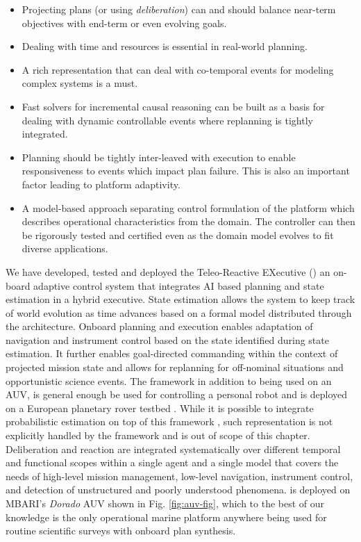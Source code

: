 \begin{itemize}

\item Projecting plans (or using \emph{deliberation}) can and should
  balance near-term objectives with end-term or even evolving goals.

\item Dealing with time and resources is essential in real-world
  planning.

\item A rich representation that can deal with co-temporal events for
  modeling complex systems is a must.

\item Fast solvers for incremental causal reasoning can be built as a
  basis for dealing with dynamic controllable events where replanning
  is tightly integrated.

\item Planning should be tightly inter-leaved with execution to enable
  responsiveness to events which impact plan failure. This is also an
  important factor leading to platform adaptivity.

\item A model-based approach separating control formulation of the
  platform which describes operational characteristics from the
  domain. The controller can then be rigorously tested and certified
  even as the domain model evolves to fit diverse applications.

\end{itemize}

We have developed, tested and deployed the Teleo-Reactive EXecutive
(\rx) an on-board adaptive control system that integrates AI based
planning and state estimation in a hybrid
executive\cite{mcgann08a,mcgann08b,py10}.  State estimation allows the
system to keep track of world evolution as time advances based on a
formal model distributed through the architecture.  Onboard planning
and execution enables adaptation of navigation and instrument control
based on the state identified during state estimation.  It further
enables goal-directed commanding within the context of projected
mission state and allows for replanning for off-nominal situations and
opportunistic science events. The framework in addition to being used
on an AUV, is general enough be used for controlling a personal robot
\cite{pr2,Meeussen:2010dn,mcgann2009} and is deployed on a European
planetary rover testbed \cite{goac11}. While it is possible to
integrate probabilistic estimation on top of this framework
\cite{mcgann08d}, such representation is not explicitly handled by the
framework and is out of scope of this chapter.  Deliberation and
reaction are integrated systematically over different temporal and
functional scopes within a single agent and a single model that covers
the needs of high-level mission management, low-level navigation,
instrument control, and detection of unstructured and poorly
understood phenomena. \rx is deployed on MBARI's \emph{Dorado} AUV
shown in Fig. \ref{fig:auv-fig}, which to the best of our knowledge is
the only operational marine platform anywhere being used for routine
scientific surveys with onboard plan synthesis.

